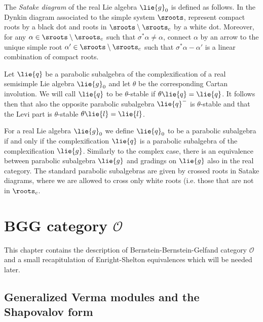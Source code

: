 The \emph{Satake diagram} of the real Lie algebra $\lie{g}_0$ is defined as follows. In the Dynkin diagram associated to the simple system $\sroots$, represent compact roots by a black dot and roots in $\sroots\setminus\sroots_c$ by a white dot. Moreover, for any $\alpha\in\sroots\setminus\sroots_c$ such that $\sigma^*\alpha\neq\alpha$, connect $\alpha$ by an arrow  to the unique simple root $\alpha'\in\sroots\setminus\sroots_c$ such that $\sigma^*\alpha -\alpha'$ is a linear combination of compact roots.




\begin{definition}
 Let $\lie{q}$ be a parabolic subalgebra of the complexification of a real semisimple Lie algebra $\lie{g}_0$ and let $\theta$ be the corresponding Cartan involution. We will call $\lie{q}$ to be $\theta$-stable if $\theta \lie{q} = \lie{q}$. It follows then that also the opposite parabolic subalgebra $\lie{q}^-$ is $\theta$-stable and that the Levi part is $\theta$-stable $\theta \lie{l} = \lie{l}$.
\end{definition}

For a real Lie algebra $\lie{g}_0$ we define $\lie{q}_0$ to be a parabolic subalgebra if and only if the complexification $\lie{q}$ is a parabolic subalgebra of the complexification $\lie{g}$. Similarly to the complex case, there is an equivalence between parabolic subalgebra $\lie{g}$ and gradings on $\lie{g}$ also in the real category. The standard parabolic subalgebras are given by crossed roots in Satake diagrams, where we are allowed to cross only white roots (i.e. those that are not in $\roots_c$.


\section[BGG category O]{BGG category $\mathcal{O}$}

This chapter contains the description of Bernstein-Bernstein-Gelfand category $\mathcal{O}$ and a small recapitulation of Enright-Shelton equivalences which will be needed later.


\subsection{Generalized Verma modules and the Shapovalov form}


